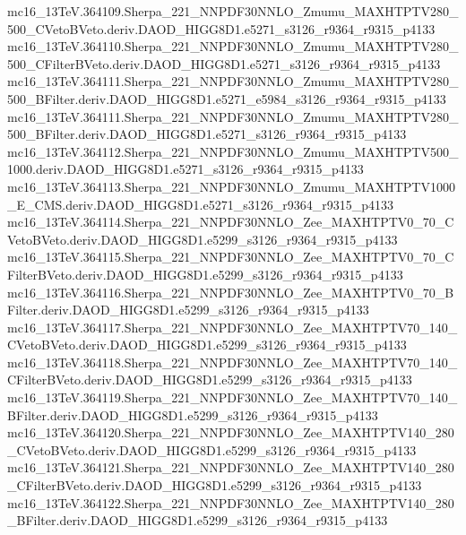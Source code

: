 \begin{footnotesize}
mc16\_13TeV.364109.Sherpa\_221\_NNPDF30NNLO\_Zmumu\_MAXHTPTV280\_500\_CVetoBVeto.deriv.DAOD\_HIGG8D1.e5271\_s3126\_r9364\_r9315\_p4133 \\
mc16\_13TeV.364110.Sherpa\_221\_NNPDF30NNLO\_Zmumu\_MAXHTPTV280\_500\_CFilterBVeto.deriv.DAOD\_HIGG8D1.e5271\_s3126\_r9364\_r9315\_p4133 \\
mc16\_13TeV.364111.Sherpa\_221\_NNPDF30NNLO\_Zmumu\_MAXHTPTV280\_500\_BFilter.deriv.DAOD\_HIGG8D1.e5271\_e5984\_s3126\_r9364\_r9315\_p4133 \\
mc16\_13TeV.364111.Sherpa\_221\_NNPDF30NNLO\_Zmumu\_MAXHTPTV280\_500\_BFilter.deriv.DAOD\_HIGG8D1.e5271\_s3126\_r9364\_r9315\_p4133 \\
mc16\_13TeV.364112.Sherpa\_221\_NNPDF30NNLO\_Zmumu\_MAXHTPTV500\_1000.deriv.DAOD\_HIGG8D1.e5271\_s3126\_r9364\_r9315\_p4133 \\
mc16\_13TeV.364113.Sherpa\_221\_NNPDF30NNLO\_Zmumu\_MAXHTPTV1000\_E\_CMS.deriv.DAOD\_HIGG8D1.e5271\_s3126\_r9364\_r9315\_p4133 \\
mc16\_13TeV.364114.Sherpa\_221\_NNPDF30NNLO\_Zee\_MAXHTPTV0\_70\_CVetoBVeto.deriv.DAOD\_HIGG8D1.e5299\_s3126\_r9364\_r9315\_p4133 \\
mc16\_13TeV.364115.Sherpa\_221\_NNPDF30NNLO\_Zee\_MAXHTPTV0\_70\_CFilterBVeto.deriv.DAOD\_HIGG8D1.e5299\_s3126\_r9364\_r9315\_p4133 \\
mc16\_13TeV.364116.Sherpa\_221\_NNPDF30NNLO\_Zee\_MAXHTPTV0\_70\_BFilter.deriv.DAOD\_HIGG8D1.e5299\_s3126\_r9364\_r9315\_p4133 \\
mc16\_13TeV.364117.Sherpa\_221\_NNPDF30NNLO\_Zee\_MAXHTPTV70\_140\_CVetoBVeto.deriv.DAOD\_HIGG8D1.e5299\_s3126\_r9364\_r9315\_p4133 \\
mc16\_13TeV.364118.Sherpa\_221\_NNPDF30NNLO\_Zee\_MAXHTPTV70\_140\_CFilterBVeto.deriv.DAOD\_HIGG8D1.e5299\_s3126\_r9364\_r9315\_p4133 \\
mc16\_13TeV.364119.Sherpa\_221\_NNPDF30NNLO\_Zee\_MAXHTPTV70\_140\_BFilter.deriv.DAOD\_HIGG8D1.e5299\_s3126\_r9364\_r9315\_p4133 \\
mc16\_13TeV.364120.Sherpa\_221\_NNPDF30NNLO\_Zee\_MAXHTPTV140\_280\_CVetoBVeto.deriv.DAOD\_HIGG8D1.e5299\_s3126\_r9364\_r9315\_p4133 \\
mc16\_13TeV.364121.Sherpa\_221\_NNPDF30NNLO\_Zee\_MAXHTPTV140\_280\_CFilterBVeto.deriv.DAOD\_HIGG8D1.e5299\_s3126\_r9364\_r9315\_p4133 \\
mc16\_13TeV.364122.Sherpa\_221\_NNPDF30NNLO\_Zee\_MAXHTPTV140\_280\_BFilter.deriv.DAOD\_HIGG8D1.e5299\_s3126\_r9364\_r9315\_p4133 \\

\end{footnotesize}
